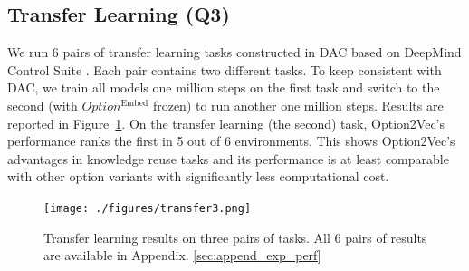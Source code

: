 \documentclass{article}
\begin{document}
\vspace{-2mm}\subsection{Transfer Learning (Q3)}
\label{sec:transfer}
We run 6 pairs of transfer learning tasks constructed in DAC
based on DeepMind Control Suite \cite{tassa2020dmcontrol}. Each
pair contains two different tasks. To keep consistent with DAC,
we train all models one million steps on the first task and
switch to the second (with $Option^{\textrm{Embed}}$ frozen) to run
another one million steps. Results are reported in
Figure~\ref{fig:transfer}. On the transfer learning (the second)
task, Option2Vec's performance ranks the first in 5 out of 6
environments. This shows Option2Vec's advantages in knowledge
reuse tasks and its performance is at least comparable with other
option variants with significantly less computational cost.
\vspace{-2mm}
\begin{figure}[h]
  \vspace{-2mm} \centering
  \texttt{[image: ./figures/transfer3.png]}\\
  \vspace{-2mm}
  \caption{\small\label{fig:transfer} Transfer learning
    results on three pairs of tasks. All 6 pairs of results are available in Appendix.
    \ref{sec:append_exp_perf}}
  \vspace{-4mm}
\end{figure}
\end{document}
